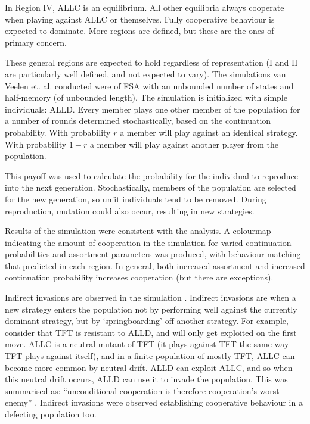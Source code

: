 \documentclass[a4paper,11pt]{article}
\begin{document}
In Region IV, ALLC is an equilibrium. All other equilibria always cooperate when playing against ALLC or themselves. Fully cooperative behaviour is expected to dominate. More regions are defined, but these are the ones of primary concern.

These general regions are expected to hold regardless of representation (I and II are particularly well defined, and not expected to vary).
The simulations van Veelen et. al. conducted were of FSA with an unbounded number of states and half-memory (of unbounded length). The simulation is initialized with simple individuals: ALLD. Every member plays one other member of the population for a number of rounds determined stochastically, based on the continuation probability. With probability $r$ a member will play against an identical strategy. With probability $1-r$ a member will play against another player from the population. 

This payoff was used to calculate the probability for the individual to reproduce into the next generation. Stochastically, members of the population are selected for the new generation, so unfit individuals tend to be removed. 
During reproduction, mutation could also occur, resulting in new strategies. 

Results of the simulation were consistent with the analysis. 
A colourmap indicating the amount of cooperation in the simulation for varied continuation probabilities and assortment parameters was produced, with behaviour matching that predicted in each region. 
In general, both increased assortment and increased continuation probability increases cooperation (but there are exceptions). 

Indirect invasions are observed in the simulation \citep{garcia:PLoSOne:2012}. 
Indirect invasions are when a new strategy enters the population not by performing well against the currently dominant strategy, but by `springboarding' off another strategy. 
For example, consider that TFT is resistant to ALLD, and will only get exploited on the first move. 
ALLC is a neutral mutant of TFT (it plays against TFT the same way TFT plays against itself), and in a finite population of mostly TFT, ALLC can become more common by neutral drift. 
ALLD can exploit ALLC, and so when this neutral drift occurs, ALLD can use it to invade the population. 
This was summarised as: ``unconditional cooperation is therefore cooperation's worst enemy'' \citep{van-veelen:PNAS:2012}. 
Indirect invasions were observed establishing cooperative behaviour in a defecting population too. 
\end{document}
